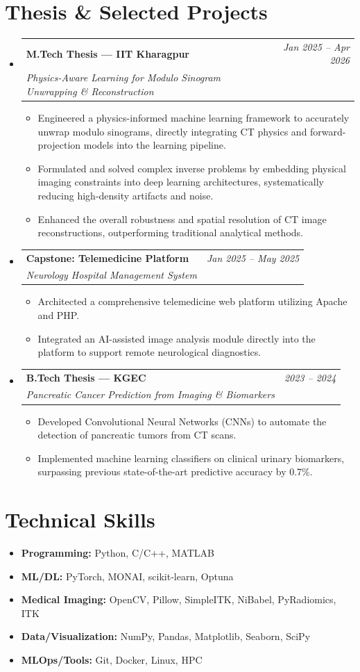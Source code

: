\documentclass[a4paper,11pt]{article}
\makeatletter
\newcommand{\resumeProject}[4]{
\item
    \begin{tabular*}{0.98\textwidth}[t]{l@{\extracolsep{\fill}}r}
        \textbf{#1} & \textit{\footnotesize{#3}} \\
        \footnotesize{\textit{#2}} & \footnotesize{#4}
    \end{tabular*}
}
\newcommand{\resumeItem}[1]{\item #1}
\newcommand{\resumeListStart}{\begin{itemize}[leftmargin=*]}
\newcommand{\resumeListEnd}{\end{itemize}\vspace{-1mm}}
\makeatother
\begin{document}
\section*{Thesis \& Selected Projects}
\begin{itemize}[leftmargin=*]
  \resumeProject{M.Tech Thesis — IIT Kharagpur}{Physics-Aware Learning for Modulo Sinogram Unwrapping \& Reconstruction}{Jan 2025 -- Apr 2026}{}
    \resumeListStart
      \resumeItem{Engineered a physics-informed machine learning framework to accurately unwrap modulo sinograms, directly integrating CT physics and forward-projection models into the learning pipeline.}
      \resumeItem{Formulated and solved complex inverse problems by embedding physical imaging constraints into deep learning architectures, systematically reducing high-density artifacts and noise.}
      \resumeItem{Enhanced the overall robustness and spatial resolution of CT image reconstructions, outperforming traditional analytical methods.}
    \resumeListEnd

  \resumeProject{Capstone: Telemedicine Platform}{Neurology Hospital Management System}{Jan 2025 -- May 2025}{}
    \resumeListStart
      \resumeItem{Architected a comprehensive telemedicine web platform utilizing Apache and PHP.}
      \resumeItem{Integrated an AI-assisted image analysis module directly into the platform to support remote neurological diagnostics.}
    \resumeListEnd

  \resumeProject{B.Tech Thesis — KGEC}{Pancreatic Cancer Prediction from Imaging \& Biomarkers}{2023 -- 2024}{}
    \resumeListStart
      \resumeItem{Developed Convolutional Neural Networks (CNNs) to automate the detection of pancreatic tumors from CT scans.}
      \resumeItem{Implemented machine learning classifiers on clinical urinary biomarkers, surpassing previous state-of-the-art predictive accuracy by 0.7\%.}
    \resumeListEnd
\end{itemize}

\section*{Technical Skills}
\begin{itemize}[leftmargin=*]
  \resumeItem{\textbf{Programming:} Python, C/C++, MATLAB}
  \resumeItem{\textbf{ML/DL:} PyTorch, MONAI, scikit-learn, Optuna}
  \resumeItem{\textbf{Medical Imaging:} OpenCV, Pillow, SimpleITK, NiBabel, PyRadiomics, ITK}
  \resumeItem{\textbf{Data/Visualization:} NumPy, Pandas, Matplotlib, Seaborn, SciPy}
  \resumeItem{\textbf{MLOps/Tools:} Git, Docker, Linux, HPC}
\end{itemize}
\end{document}
